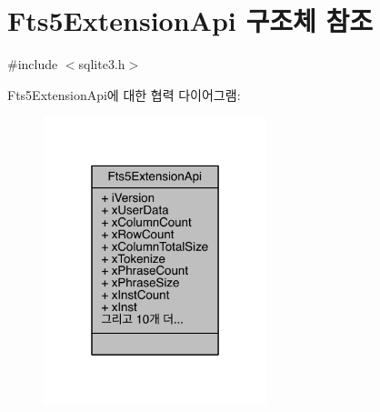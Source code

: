 \hypertarget{struct_fts5_extension_api}{}\section{Fts5\+Extension\+Api 구조체 참조}
\label{struct_fts5_extension_api}


{\ttfamily \#include $<$sqlite3.\+h$>$}



Fts5\+Extension\+Api에 대한 협력 다이어그램\+:
\nopagebreak
\begin{figure}[H]
\begin{center}
\leavevmode
\includegraphics[width=184pt]{struct_fts5_extension_api__coll__graph}
\end{center}
\end{figure}
